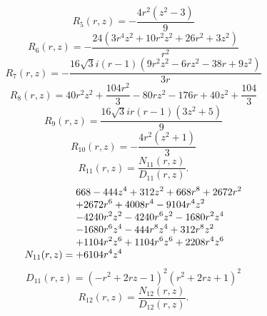 \documentclass[11pt,a4paper]{article}
\begin{document}
\begin{equation}
R_{5}(r,z)=- \frac{4 r^{2} \left(z^{2} - 3\right)}{9}
\label{eq:cat-rational-5}
\end{equation}
\begin{equation}
R_{6}(r,z)=- \frac{24 \left(3 r^{4} z^{2} + 10 r^{2} z^{2} + 26 r^{2} + 3 z^{2}\right)}{r^{2}}
\label{eq:cat-rational-6}
\end{equation}
\begin{equation}
R_{7}(r,z)=- \frac{16 \sqrt{3} i \left(r - 1\right) \left(9 r^{2} z^{2} - 6 r z^{2} - 38 r + 9 z^{2}\right)}{3 r}
\label{eq:cat-rational-7}
\end{equation}
\begin{equation}
R_{8}(r,z)=40 r^{2} z^{2} + \frac{104 r^{2}}{3} - 80 r z^{2} - 176 r + 40 z^{2} + \frac{104}{3}
\label{eq:cat-rational-8}
\end{equation}
\begin{equation}
R_{9}(r,z)=\frac{16 \sqrt{3} i r \left(r - 1\right) \left(3 z^{2} + 5\right)}{9}
\label{eq:cat-rational-9}
\end{equation}
\begin{equation}
R_{10}(r,z)=- \frac{4 r^{2} \left(z^{2} + 1\right)}{3}
\label{eq:cat-rational-10}
\end{equation}
\begin{equation}
R_{11}(r,z)=\frac{N_{11}(r,z)}{D_{11}(r,z)}.
\label{eq:cat-rational-11}
\end{equation}
\begin{equation}
N_{11}(r,z)=\shortstack[l]{$\displaystyle 668 - 444 z^{4} + 312 z^{2} + 668 r^{8} + 2672 r^{2}$\\
$\displaystyle  + 2672 r^{6} + 4008 r^{4} - 9104 r^{4} z^{2}$\\
$\displaystyle  - 4240 r^{2} z^{2} - 4240 r^{6} z^{2} - 1680 r^{2} z^{4}$\\
$\displaystyle  - 1680 r^{6} z^{4} - 444 r^{8} z^{4} + 312 r^{8} z^{2}$\\
$\displaystyle  + 1104 r^{2} z^{6} + 1104 r^{6} z^{6} + 2208 r^{4} z^{6}$\\
$\displaystyle  + 6104 r^{4} z^{4}$}
\label{eq:cat-numerator-11}
\end{equation}
\begin{equation}
D_{11}(r,z)=\left(- r^{2} + 2 r z - 1\right)^{2} \left(r^{2} + 2 r z + 1\right)^{2}
\label{eq:cat-denominator-11}
\end{equation}
\begin{equation}
R_{12}(r,z)=\frac{N_{12}(r,z)}{D_{12}(r,z)}.
\label{eq:cat-rational-12}
\end{equation}
\end{document}
